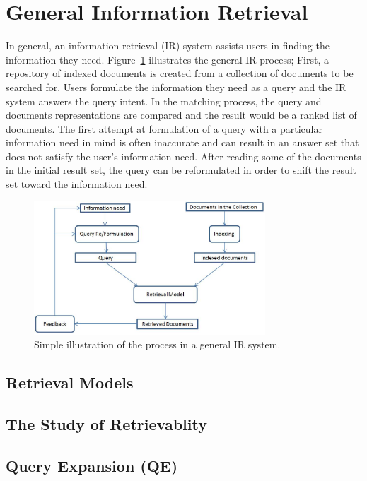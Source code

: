 \section{General Information Retrieval}
In general, an information retrieval (IR) system assists users in finding the information they need. Figure~\ref{fig:generalir} illustrates the general IR process; First, a repository of indexed documents is created from a collection of documents to be searched for. Users formulate the information they need as a query and the IR system answers the query intent. In the matching process, the query and documents representations are compared and the result would be a ranked list of documents. The first attempt at formulation of a query with a particular information need in mind
is often inaccurate and can result in an answer set that does not satisfy the user's information need. 
After reading some of the documents in the initial result set, the query can be reformulated in order to shift the result set toward the information need.
\begin{figure}[htpb]
   \centering
   \includegraphics[width=.60\textwidth,height=50mm]{figs/generalIR.jpg}
   \caption{Simple illustration of the process in a general IR system.}  
   \label{fig:generalir} 
\end{figure}
\FloatBarrier 
\subsection{Retrieval Models}
\label{subsub:retmodels}


\subsection{The Study of Retrievablity}

\label{subsub:retrievability}

\subsection{Query Expansion (QE)}


